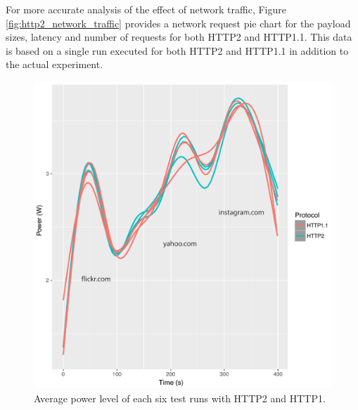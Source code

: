 \documentclass{article}
\begin{document}
For more accurate analysis of the effect of network traffic, Figure \ref{fig:http2_network_traffic} provides a network request pie chart for the payload sizes, latency and number of requests for both HTTP2 and HTTP1.1. This data is based on a single run executed for both HTTP2 and HTTP1.1 in addition to the actual experiment.

\begin{figure}[h!]
\centering
\includegraphics[scale=0.73]{images/smoothed_power}
\caption{Average power level of each six test runs with HTTP2 and HTTP1.}
\label{fig:smoothed_power}
\end{figure}
\end{document}
